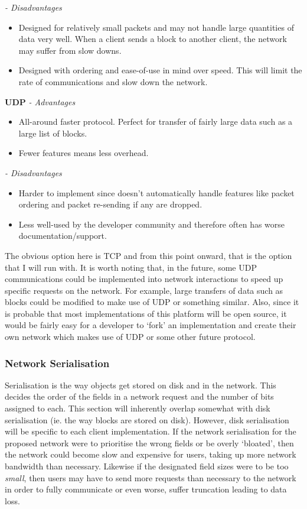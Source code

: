 \documentclass{article}
\begin{document}
\textit{ - Disadvantages}
\begin{itemize}
    \item Designed for relatively small packets and may not handle large quantities of data very well. When a client sends a block to another client, the network may suffer from slow downs.
    \item Designed with ordering and ease-of-use in mind over speed. This will limit the rate of communications and slow down the network.
\end{itemize}

\textbf{UDP}
\textit{ - Advantages}
\begin{itemize}
    \item All-around faster protocol. Perfect for transfer of fairly large data such as a large list of blocks.
    \item Fewer features means less overhead.
\end{itemize}

\textit{ - Disadvantages}
\begin{itemize}
    \item Harder to implement since doesn't automatically handle features like packet ordering and packet re-sending if any are dropped.
    \item Less well-used by the developer community and therefore often has worse documentation/support.
\end{itemize}

The obvious option here is TCP and from this point onward, that is the option that I will run with. It is worth noting that, in the future, some UDP communications could be implemented into network interactions to speed up specific requests on the network. For example, large transfers of data such as blocks could be modified to make use of UDP or something similar. Also, since it is probable that most implementations of this platform will be open source, it would be fairly easy for a developer to `fork' an implementation and create their own network which makes use of UDP or some other future protocol.

\subsubsection{Network Serialisation}
Serialisation is the way objects get stored on disk and in the network. This decides the order of the fields in a network request and the number of bits assigned to each. This section will inherently overlap somewhat with disk serialisation (ie. the way blocks are stored on disk). However, disk serialisation will be specific to each client implementation. If the network serialisation for the proposed network were to prioritise the wrong fields or be overly `bloated', then the network could become slow and expensive for users, taking up more network bandwidth than necessary. Likewise if the designated field sizes were to be too \textit{small}, then users may have to send more requests than necessary to the network in order to fully communicate or even worse, suffer truncation leading to data loss.
\end{document}
